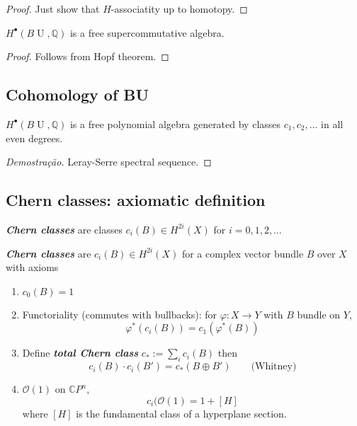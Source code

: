\begin{proof}
	Just show that $H$-associatity up to homotopy.
\end{proof}

\begin{coro}
	$H^\bullet(B\operatorname{U},\mathbb{Q})$ is a free supercommutative algebra.
\end{coro}
\begin{proof}
	Follows from Hopf theorem.
\end{proof}

\subsection{Cohomology of BU}

\begin{claim}
	$H^\bullet(B\operatorname{U},\mathbb{Q})$ is a free polynomial algebra generated by classes $c_1,c_2,\ldots$ in all even degrees.
\end{claim}

\begin{proof}[Demostra\c c\~ao]
	Leray-Serre spectral sequence.
\end{proof}

\subsection{Chern classes: axiomatic definition}

\begin{defn}
	\textit{\textbf{Chern classes}} are classes  $c_i(B)\in H^{2i}(X)$ for $i=0,1,2,\ldots$

	\textit{\textbf{Chern classes}} are  $c_i(B)\in H^{2i}(X)$ for a complex vector bundle $B$ over $X$ with axioms

	\begin{enumerate}[label=\alph*.]
		\item $c_0(B)=1$

		\item Functoriality (commutes with bullbacks): for $\varphi:X\to Y$ with $B$ bundle on $Y$, 
			 \[\varphi^*(c_i(B))=c_1(\varphi^*(B))\]

		\item Define \textit{\textbf{total Chern class}}  $c_{*}:=\sum_{i}c_i(B)$ then
			\[c_i(B)\cdot c_i(B')=c_*(B\oplus B')\qquad \text{(Whitney)} \]

		\item $\mathcal{O}(1)$ on $\mathbb{C}P^{n}$,
			\[c_i(\mathcal{O}(1)=1+[H]\]
			where $[H]$ is the fundamental class of a hyperplane section.
	\end{enumerate}
\end{defn}

